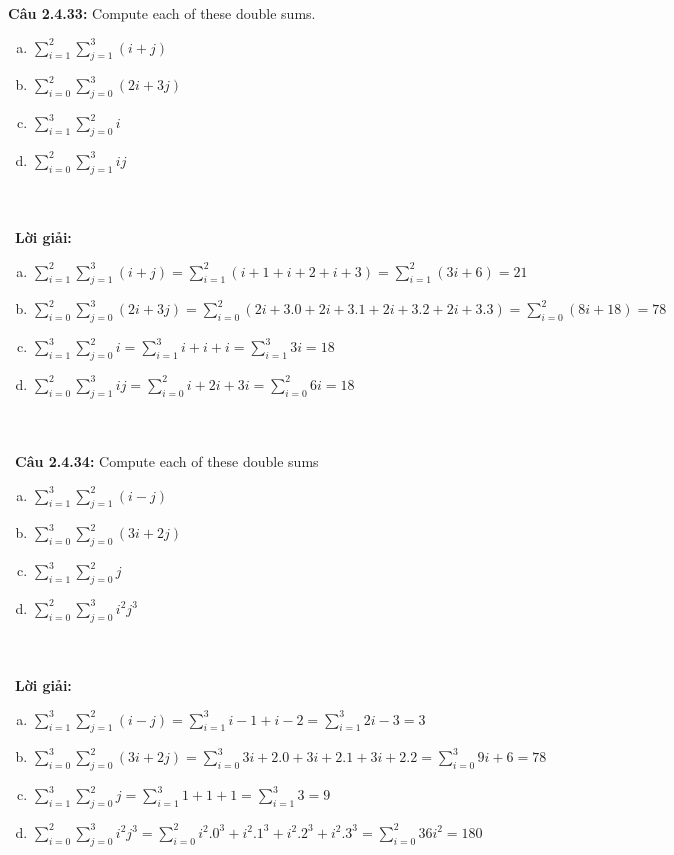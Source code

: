 \documentclass[a4paper]{article}
\begin{document}
\textbf{Câu 2.4.33: } Compute each of these double sums.
\begin{enumerate}[a)]
\item $\sum_{i=1}^{2} \sum_{j=1}^{3}(i+j)$
\item $\sum_{i=0}^{2} \sum_{j=0}^{3}(2i+3j)$
\item $\sum_{i=1}^{3} \sum_{j=0}^{2}i$
\item $\sum_{i=0}^{2} \sum_{j=1}^{3}ij$
\end{enumerate} \\\ \\\
\textbf{Lời giải:} \begin{enumerate}[a)]
\item $\sum_{i=1}^{2} \sum_{j=1}^{3}(i+j)=\sum_{i=1}^{2}(i+1+i+2+i+3)=\sum_{i=1}^{2}(3i+6)=21$
\item $\sum_{i=0}^{2} \sum_{j=0}^{3}(2i+3j)=\sum_{i=0}^{2}(2i+3.0+2i+3.1+2i+3.2+2i+3.3)=\sum_{i=0}^{2}(8i+18)=78$
\item $\sum_{i=1}^{3} \sum_{j=0}^{2}i=\sum_{i=1}^{3}i+i+i=\sum_{i=1}^{3}3i=18$
\item $\sum_{i=0}^{2} \sum_{j=1}^{3}ij=\sum_{i=0}^{2}i+2i+3i=\sum_{i=0}^{2}6i=18$
\end{enumerate}
 \\\ \\\
\textbf{Câu 2.4.34: }  Compute each of these double sums
\begin{enumerate}[a)]
\item $\sum_{i=1}^{3} \sum_{j=1}^{2}(i-j)$
\item $\sum_{i=0}^{3} \sum_{j=0}^{2}(3i+2j)$
\item $\sum_{i=1}^{3} \sum_{j=0}^{2}j$
\item $\sum_{i=0}^{2} \sum_{j=0}^{3}i^{2}j^{3}$
\end{enumerate} \\\ \\\
\textbf{Lời giải:} \begin{enumerate}[a)]
\item $\sum_{i=1}^{3} \sum_{j=1}^{2}(i-j)=\sum_{i=1}^{3}i-1+i-2=\sum_{i=1}^{3}2i-3=3$
\item $\sum_{i=0}^{3} \sum_{j=0}^{2}(3i+2j)=\sum_{i=0}^{3}3i+2.0+3i+2.1+3i+2.2=\sum_{i=0}^{3}9i+6=78$
\item $\sum_{i=1}^{3} \sum_{j=0}^{2}j=\sum_{i=1}^{3}1+1+1=\sum_{i=1}^{3}3=9$
\item $\sum_{i=0}^{2} \sum_{j=0}^{3}i^{2}j^{3}=\sum_{i=0}^{2}i^{2}.0^{3}+i^{2}.1^{3}+i^{2}.2^{3}+i^{2}.3^{3}=\sum_{i=0}^{2}36i^{2}=180$
\end{enumerate} \\\ \\\
\end{document}
